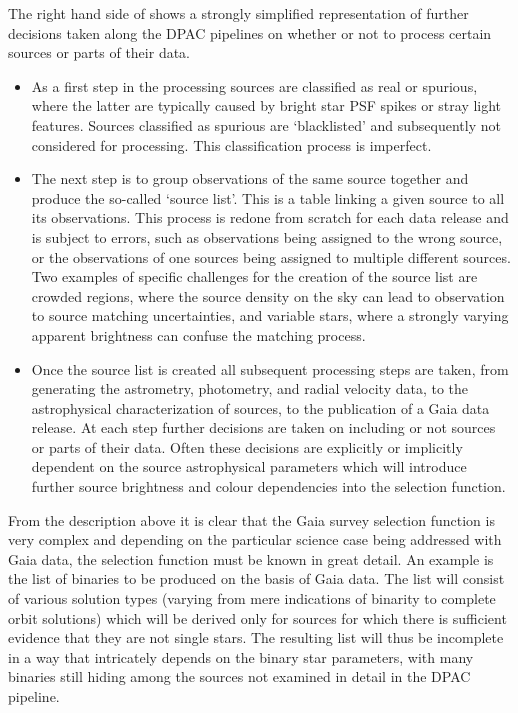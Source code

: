 The right hand side of  shows a strongly simplified representation of further decisions taken along the DPAC pipelines on whether or not to process certain sources or parts of their data.
\begin{itemize}
    \item As a first step in the processing sources are classified as real or spurious, where the latter are typically caused by bright star PSF spikes or stray light features. Sources classified as spurious are `blacklisted' and subsequently not considered for processing. This classification process is imperfect.
    \item The next step is to group observations of the same source together and produce the so-called `source list'. This is a table linking a given source to all its observations. This process is redone from scratch for each data release and is subject to errors, such as observations being assigned to the wrong source, or the observations of one sources being assigned to multiple different sources. Two examples of specific challenges for the creation of the source list are crowded regions, where the source density on the sky can lead to observation to source matching uncertainties, and variable stars, where a strongly varying apparent brightness can confuse the matching process.
    \item Once the source list is created all subsequent processing steps are taken, from generating the astrometry, photometry, and radial velocity data, to the astrophysical characterization of sources, to the publication of a Gaia data release. At each step further decisions are taken on including or not sources or parts of their data. Often these decisions are explicitly or implicitly dependent on the source astrophysical parameters which will introduce further source brightness and colour dependencies into the selection function.
\end{itemize}

From the description above it is clear that the Gaia survey selection function is very complex and depending on the particular science case being addressed with Gaia data, the selection function must be known in great detail. An example is the list of binaries to be produced on the basis of Gaia data. The list will consist of various solution types (varying from mere indications of binarity to complete orbit solutions) which will be derived only for sources for which there is sufficient evidence that they are not single stars. The resulting list will thus be incomplete in a way that intricately depends on the binary star parameters, with many binaries still hiding among the sources not examined in detail in the DPAC pipeline.

